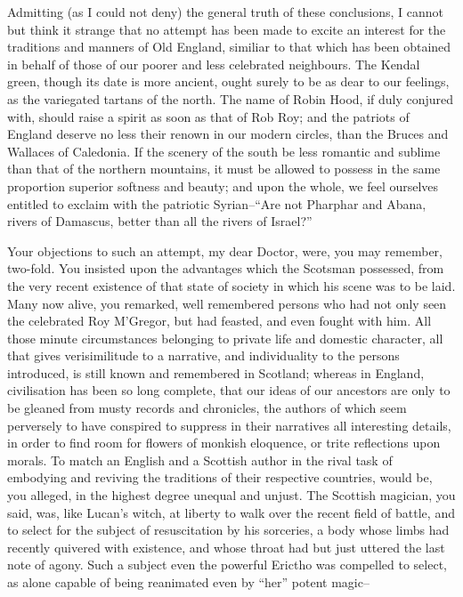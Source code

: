 Admitting (as I could not deny) the general truth of these conclusions,
I cannot but think it strange that no attempt has been made to excite an
interest for the traditions and manners of Old England, similiar to that
which has been obtained in behalf of those of our poorer and less
celebrated neighbours. The Kendal green, though its date is more
ancient, ought surely to be as dear to our feelings, as the variegated
tartans of the north. The name of Robin Hood, if duly conjured with,
should raise a spirit as soon as that of Rob Roy; and the patriots of
England deserve no less their renown in our modern circles, than the
Bruces and Wallaces of Caledonia. If the scenery of the south be less
romantic and sublime than that of the northern mountains, it must be
allowed to possess in the same proportion superior softness and beauty;
and upon the whole, we feel ourselves entitled to exclaim with the
patriotic Syrian--``Are not Pharphar and Abana, rivers of Damascus,
better than all the rivers of Israel?''

Your objections to such an attempt, my dear Doctor, were, you may
remember, two-fold. You insisted upon the advantages which the Scotsman
possessed, from the very recent existence of that state of society in
which his scene was to be laid. Many now alive, you remarked, well
remembered persons who had not only seen the celebrated Roy M'Gregor,
but had feasted, and even fought with him. All those minute
circumstances belonging to private life and domestic character, all that
gives verisimilitude to a narrative, and individuality to the persons
introduced, is still known and remembered in Scotland; whereas in
England, civilisation has been so long complete, that our ideas of our
ancestors are only to be gleaned from musty records and chronicles, the
authors of which seem perversely to have conspired to suppress in their
narratives all interesting details, in order to find room for flowers of
monkish eloquence, or trite reflections upon morals. To match an English
and a Scottish author in the rival task of embodying and reviving the
traditions of their respective countries, would be, you alleged, in the
highest degree unequal and unjust. The Scottish magician, you said, was,
like Lucan's witch, at liberty to walk over the recent field of battle,
and to select for the subject of resuscitation by his sorceries, a body
whose limbs had recently quivered with existence, and whose throat had
but just uttered the last note of agony. Such a subject even the
powerful Erictho was compelled to select, as alone capable of being
reanimated even by ``her'' potent magic--


